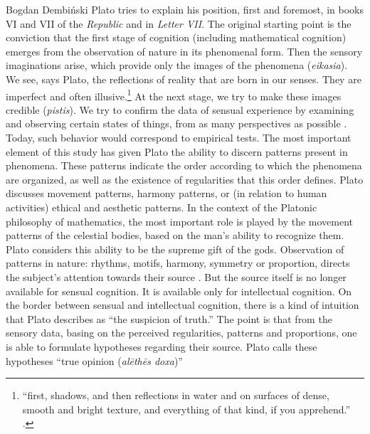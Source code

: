\begin{artengenv}{Bogdan Dembiński}
Plato tries to explain his position, first and foremost, in books VI and VII of the \textit{Republic} and in
\textit{Letter VII}. The original starting point is the conviction that the first stage of cognition (including
mathematical cognition) emerges from the observation of nature in its phenomenal form. Then the sensory imaginations
arise, which provide only the images of the phenomena (\textit{eikasia}). We see, says Plato, the reflections of
reality that are born in our senses. They are imperfect and often illusive.\footnote{``first, shadows, and then
reflections in water and on surfaces of dense, smooth and bright texture, and everything of that kind, if you
apprehend.''
\parencite[Republic, 510a]{plato_platonis_1955}.
} At the next stage, we try to make these images
credible (\textit{pistis}). We try to confirm the data of sensual experience by examining and observing certain states
of things, from as many perspectives as possible
\parencite[Republic, 509d-511e]{plato_platonis_1955}.
Today,
such behavior would correspond to empirical tests. The most important element of this study %
has given Plato the ability to discern patterns present in phenomena. These patterns indicate the order according to
which the phenomena are organized, as well as the existence of regularities that this order defines. Plato
discusses movement patterns, harmony patterns, or (in relation to human activities) ethical and aesthetic patterns. In
the context of the Platonic philosophy of mathematics, the most important role is played by the movement patterns of
the celestial bodies, based on the man’s ability to recognize them. Plato considers this ability to be the supreme gift
of the gods. Observation of patterns in nature: rhythms, motifs, harmony, symmetry or proportion, directs the subject’s
attention towards their source
\parencite[Timaeus, 47a-e]{plato_platonis_1955}.
But the source itself is no
longer available for sensual cognition. It is available only for intellectual cognition. On the border between sensual
and intellectual cognition, there is a kind of intuition that Plato describes as ``the suspicion of truth.'' The point is
that from the sensory data, basing on the perceived regularities, patterns and proportions, one is able to formulate
hypotheses regarding their source. Plato calls these hypotheses ``true opinion (\textit{al\=eth\=es doxa})''

\end{artengenv}
